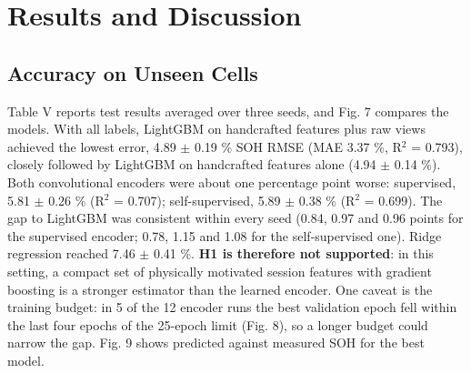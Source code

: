 \documentclass[journal]{IEEEtran}
\begin{document}
\section{Results and Discussion}
\subsection{Accuracy on Unseen Cells}
Table V reports test results averaged over three seeds, and Fig. 7 compares the models. With all labels, LightGBM on handcrafted features plus raw views achieved the lowest error, 4.89 $\pm$ 0.19 \% SOH RMSE (MAE 3.37 \%, R$^2$ = 0.793), closely followed by LightGBM on handcrafted features alone (4.94 $\pm$ 0.14 \%). Both convolutional encoders were about one percentage point worse: supervised, 5.81 $\pm$ 0.26 \% (R$^2$ = 0.707); self-supervised, 5.89 $\pm$ 0.38 \% (R$^2$ = 0.699). The gap to LightGBM was consistent within every seed (0.84, 0.97 and 0.96 points for the supervised encoder; 0.78, 1.15 and 1.08 for the self-supervised one). Ridge regression reached 7.46 $\pm$ 0.41 \%. \textbf{H1 is therefore not supported}: in this setting, a compact set of physically motivated session features with gradient boosting is a stronger estimator than the learned encoder. One caveat is the training budget: in 5 of the 12 encoder runs the best validation epoch fell within the last four epochs of the 25-epoch limit (Fig. 8), so a longer budget could narrow the gap. Fig. 9 shows predicted against measured SOH for the best model.
\end{document}
